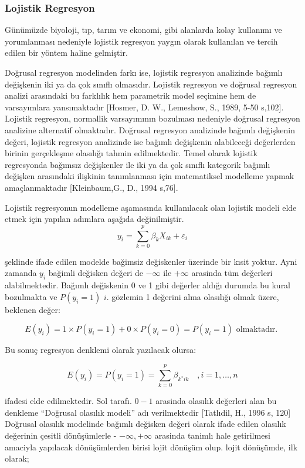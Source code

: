 \documentclass[12pt,twoside]{deuthesis}
\begin{document}
\hypertarget{lojistik-regresyon}{%
\subsubsection{Lojistik Regresyon}\label{lojistik-regresyon}}

Günümüzde biyoloji, tıp, tarım ve ekonomi, gibi alanlarda kolay kullanımı ve yorumlanması nedeniyle lojistik regresyon yaygın olarak kullanılan ve tercih edilen bir yöntem haline gelmiştir.

Doğrusal regresyon modelinden farkı ise, lojistik regresyon analizinde bağımlı değişkenin iki ya da çok sınıflı olmasıdır. Lojistik regresyon ve doğrusal regresyon analizi arasındaki bu farklılık hem parametrik model seçimine hem de varsayımlara yansımaktadır {[}Hosmer, D. W., Lemeshow, S., 1989, 5-50 s,102{]}. Lojistik regresyon, normallik varsayımının bozulması nedeniyle doğrusal regresyon analizine alternatif olmaktadır. Doğrusal regresyon analizinde bağımlı değişkenin değeri, lojistik regresyon analizinde ise bağımlı değişkenin alabileceği değerlerden birinin gerçekleşme olasılığı tahmin edilmektedir. Temel olarak lojistik regresyonda bağımsız değişkenler ile iki ya da çok sınıflı kategorik bağımlı değişken arasındaki ilişkinin tanımlanması için matematiksel modelleme yapmak amaçlanmaktadır {[}Kleinbaum,G., D., 1994 s,76{]}.

Lojistik regresyonun modelleme aşamasında kullanılacak olan lojistik modeli elde etmek için yapılan adımlara aşağıda değinilmiştir.
\[
{y_i}=\sum_{k=0}^{p} \beta_{k} {X_{ik}}+\varepsilon{_i}
\]

şeklinde ifade edilen modelde bağimsiz değiskenler üzerinde bir kısit yoktur. Ayni zamanda \({y_i}\) bağimli değisken değeri de \(-\infty\) ile \(+\infty\) arasinda tüm değerleri alabilmektedir. Bağımlı değiskenin 0 ve 1 gibi değerler aldığı durumda bu kural bozulmakta ve \(P\left({y_i}=1\right)\) \(i\). gözlemin 1 değerini alma olasılığı olmak üzere, beklenen değer:

\[
E\left({y_i}\right)=1 \times P\left({y_i}=1\right)+0 \times P\left({y_i}=0\right)=P\left({y_i}=1\right) \text { olmaktadır. }
\]

Bu sonuç regresyon denklemi olarak yazılacak olursa:

\[
E\left({y_i}\right)=P\left({y_i}=1\right)=\sum_{k=0}^{p} \beta_{k^{x} i k}\quad, {i=1,} \ldots {, n}
\]

ifadesi elde edilmektedir. Sol tarafı. \(0-1\) arasinda olasılık değerleri alan bu denkleme ``Doğrusal olasılık modeli'' adı verilmektedir {[}Tatlıdil, H., 1996 s, 120{]}
Doğrusal olasılık modelinde bağımlı değisken değeri olarak ifade edilen olasılık değerinin çesitli dönüşümlerle - \(-\infty,+\infty\) arasinda tanimlı hale getirilmesi amaciyla yapılacak dönüşümlerden birisi lojit dönüşüm olup. lojit dönüşümde, ilk olarak;
\end{document}
